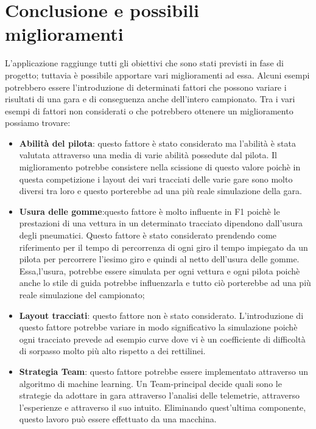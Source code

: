\chapter{Conclusione e possibili miglioramenti}
\label{sec:Conclusione e possibili miglioramenti}

L'applicazione raggiunge tutti gli obiettivi che sono stati previsti in fase di progetto; tuttavia è possibile apportare vari miglioramenti ad essa. Alcuni esempi potrebbero essere l'introduzione di determinati fattori che possono variare i risultati di una gara e di conseguenza anche dell'intero campionato. Tra i vari esempi di fattori non considerati o che potrebbero ottenere un miglioramento possiamo trovare:
\begin{itemize}

    \item\textbf{Abilità del pilota}: questo fattore è stato considerato ma l'abilità è stata valutata attraverso una media di varie abilità possedute dal pilota. Il miglioramento potrebbe consistere nella scissione di questo valore poichè in questa competizione i layout dei vari tracciati delle varie gare sono molto diversi tra loro e questo porterebbe ad una più reale simulazione della gara. 
    \item \textbf{Usura delle gomme}:questo fattore è molto influente in F1 poichè le prestazioni di una vettura in un determinato tracciato dipendono dall'usura degli pneumatici. Questo fattore è stato considerato prendendo come riferimento per il tempo di percorrenza di ogni giro il tempo impiegato da un pilota per percorrere l'iesimo giro e quindi al netto dell'usura delle gomme. Essa,l'usura, potrebbe essere simulata per ogni vettura e ogni pilota poichè anche lo stile di guida potrebbe influenzarla e tutto ciò porterebbe ad una più reale simulazione del campionato;
    \item \textbf{Layout tracciati}: questo fattore non è stato considerato. L'introduzione di questo fattore potrebbe variare in modo significativo la simulazione poichè ogni tracciato prevede ad esempio curve dove vi è un coefficiente di difficoltà di sorpasso molto più alto rispetto a dei rettilinei.\clearpage
    \item \textbf{Strategia Team}: questo fattore potrebbe essere implementato attraverso un algoritmo di machine learning. Un Team-principal decide quali sono le strategie da adottare in gara attraverso l'analisi delle telemetrie, attraverso l'esperienze e attraverso il suo intuito. Eliminando quest'ultima componente, questo lavoro può essere effettuato da una macchina.
\end{itemize}
